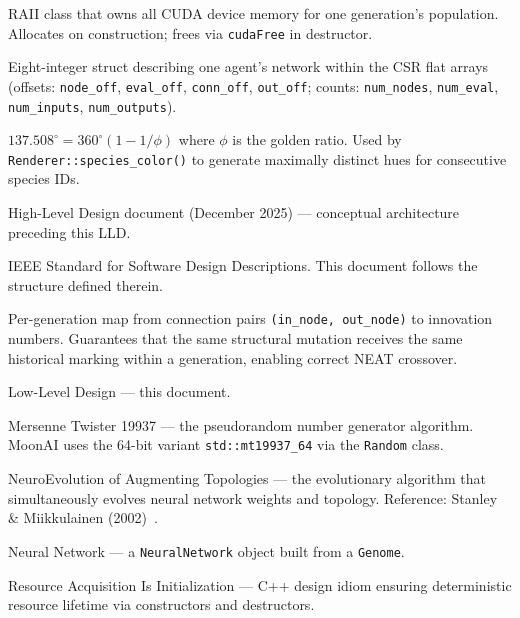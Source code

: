\begin{description}[style=nextline,leftmargin=4.5cm,font=\ttfamily\bfseries]
  \item[GpuBatch]
    RAII class that owns all CUDA device memory for one generation's population.
    Allocates on construction; frees via \texttt{cudaFree} in destructor.

  \item[GpuNetDesc]
    Eight-integer struct describing one agent's network within the CSR flat arrays
    (offsets: \texttt{node\_off}, \texttt{eval\_off}, \texttt{conn\_off},
    \texttt{out\_off}; counts: \texttt{num\_nodes}, \texttt{num\_eval},
    \texttt{num\_inputs}, \texttt{num\_outputs}).

  \item[Golden angle]
    $137.508^\circ = 360^\circ(1 - 1/\phi)$ where $\phi$ is the golden ratio.
    Used by \texttt{Renderer::species\_color()} to generate maximally distinct hues
    for consecutive species IDs.

  \item[HLD]
    High-Level Design document (December 2025) — conceptual architecture preceding this
    LLD.

  \item[IEEE 1016-2009]
    IEEE Standard for Software Design Descriptions.  This document follows the structure
    defined therein.

  \item[InnovationTracker]
    Per-generation map from connection pairs \texttt{(in\_node, out\_node)} to
    innovation numbers.  Guarantees that the same structural mutation receives the same
    historical marking within a generation, enabling correct NEAT crossover.

  \item[LLD]
    Low-Level Design — this document.

  \item[MT19937]
    Mersenne Twister 19937 — the pseudorandom number generator algorithm.  MoonAI uses
    the 64-bit variant \texttt{std::mt19937\_64} via the \texttt{Random} class.

  \item[NEAT]
    NeuroEvolution of Augmenting Topologies — the evolutionary algorithm that
    simultaneously evolves neural network weights and topology.  Reference: Stanley \&
    Miikkulainen (2002)~\cite{stanley2002}.

  \item[NN]
    Neural Network — a \texttt{NeuralNetwork} object built from a \texttt{Genome}.

  \item[RAII]
    Resource Acquisition Is Initialization — C++ design idiom ensuring deterministic
    resource lifetime via constructors and destructors.


\end{description}
